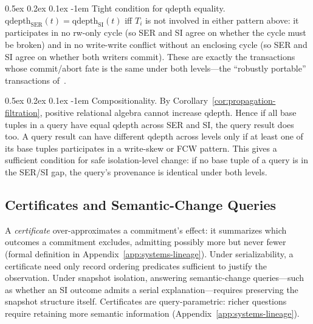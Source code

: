 \documentclass[acmsmall,review,anonymous]{acmart}
\makeatletter
\renewcommand{\paragraph}{\@startsection{paragraph}{4}{\z@}%
  {0.5ex \@plus 0.2ex \@minus 0.1ex}%
  {-1em}%
  {\normalfont\normalsize\bfseries}}
\theoremstyle{remark}
\numberwithin{definition}{section}
\numberwithin{theorem}{section}
\numberwithin{lemma}{section}
\numberwithin{corollary}{section}
\numberwithin{remark}{section}
\numberwithin{example}{section}
\numberwithin{observation}{section}
\numberwithin{assumption}{section}
\makeatother
\begin{document}
\paragraph{Tight condition for qdepth equality.}
$\mathrm{qdepth}_{\mathrm{SER}}(t) = \mathrm{qdepth}_{\mathrm{SI}}(t)$
iff $T_i$ is not involved in either pattern above: it participates in
no rw-only cycle (so SER and SI agree on whether the cycle must be
broken) and in no write-write conflict without an enclosing cycle (so
SER and SI agree on whether both writers commit).
These are exactly the transactions whose commit/abort fate is the same
under both levels---the ``robustly portable'' transactions
of~\cite{vandevoort2025mixed}.

\paragraph{Compositionality.}
By Corollary~\ref{cor:propagation-filtration}, positive relational
algebra cannot increase qdepth.
Hence if all base tuples in a query have equal qdepth across SER and
SI, the query result does too.
A query result can have different qdepth across levels only if at least
one of its base tuples participates in a write-skew or FCW pattern.
This gives a sufficient condition for safe isolation-level change:
if no base tuple of a query is in the SER/SI gap, the query's
provenance is identical under both levels.

\subsection{Certificates and Semantic-Change Queries}

A \emph{certificate} over-approximates a commitment's effect: it
summarizes which outcomes a commitment excludes, admitting possibly more
but never fewer (formal definition in
Appendix~\ref{app:systems-lineage}).
Under serializability, a certificate need only record ordering predicates
sufficient to justify the observation.
Under snapshot isolation, answering semantic-change queries---such as
whether an SI outcome admits a serial explanation---requires preserving
the snapshot structure itself.
Certificates are query-parametric: richer
questions require retaining more semantic information
(Appendix~\ref{app:systems-lineage}).

\end{document}
